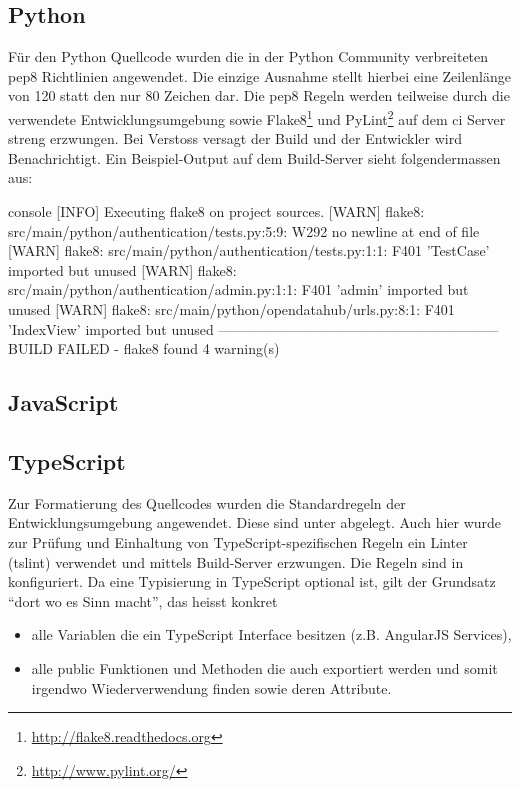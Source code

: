 \subsection{Python}
Für den Python Quellcode wurden die in der Python Community verbreiteten \gls{pep8} Richtlinien angewendet. Die einzige Ausnahme stellt hierbei eine Zeilenlänge von 120 statt den nur 80 Zeichen dar. Die \gls{pep8} Regeln werden teilweise durch die verwendete Entwicklungsumgebung sowie Flake8\footnote{\url{http://flake8.readthedocs.org}} und PyLint\footnote{\url{http://www.pylint.org/}} auf dem \gls{ci} Server streng erzwungen. Bei Verstoss versagt der Build und der Entwickler wird Benachrichtigt. Ein Beispiel-Output auf dem Build-Server sieht folgendermassen aus:

\begin{src}{console}
[INFO]  Executing flake8 on project sources.
[WARN]  flake8: src/main/python/authentication/tests.py:5:9: W292 no newline at end of file
[WARN]  flake8: src/main/python/authentication/tests.py:1:1: F401 'TestCase' imported but unused
[WARN]  flake8: src/main/python/authentication/admin.py:1:1: F401 'admin' imported but unused
[WARN]  flake8: src/main/python/opendatahub/urls.py:8:1: F401 'IndexView' imported but unused
------------------------------------------------------------
BUILD FAILED - flake8 found 4 warning(s)
\end{src}


\subsection{JavaScript}


\subsection{TypeScript}
Zur Formatierung des Quellcodes wurden die Standardregeln der Entwicklungsumgebung angewendet. Diese sind unter  abgelegt. Auch hier wurde zur Prüfung und Einhaltung von TypeScript-spezifischen Regeln ein Linter (tslint) verwendet und mittels Build-Server erzwungen. Die Regeln sind in  konfiguriert. Da eine Typisierung in TypeScript optional ist, gilt der Grundsatz ``dort wo es Sinn macht'', das heisst konkret
\begin{itemize}
\item alle Variablen die ein TypeScript Interface besitzen (z.B. AngularJS Services),
\item alle public Funktionen und Methoden die auch exportiert werden und somit irgendwo Wiederverwendung finden sowie deren Attribute.
\end{itemize}

